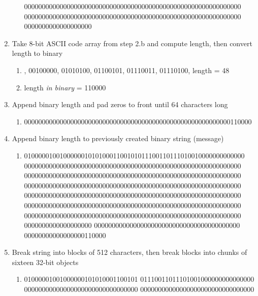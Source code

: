 \documentclass[12pt]{extarticle}
\begin{document}
\begin{enumerate}
\begin{enumerate}
        0000000000000000000000000000000000000000000000000000000000000\\
        0000000000000000000000000000000000000000000000000000000000000\\
        0000000000000000000
    \end{enumerate}
  \item Take 8-bit ASCII code array from step 2.b and compute length, then convert length to binary
     \begin{enumerate}
        \item {}, 00100000, 01010100, 01100101, 01110011, 01110100\rbrack , length = 48
        \item length {\slshape{in binary}} = 110000
    \end{enumerate}
  \item Append binary length and pad zeros to front until 64 characters long
    \begin{enumerate}
        \item 0000000000000000000000000000000000000000000000000000000000110000
    \end{enumerate}
  \item Append binary length to previously created binary string (message)
     \begin{enumerate}
        \item 01000001001000000101010001100101011100110111010010000000000000\\
        0000000000000000000000000000000000000000000000000000000000000\\
        0000000000000000000000000000000000000000000000000000000000000\\
        0000000000000000000000000000000000000000000000000000000000000\\
        0000000000000000000000000000000000000000000000000000000000000\\
        0000000000000000000000000000000000000000000000000000000000000\\
        0000000000000000000000000000000000000000000000000000000000000\\
        0000000000000000000 00000000000000000000000000000000000000000\\
        00000000000000000110000
    \end{enumerate}
  \item Break string into blocks of 512 characters, then break blocks into chunks of sixteen 32-bit objects
      \begin{enumerate}
        \item   01000001001000000101010001100101 01110011011101001000000000000000\\ 00000000000000000000000000000000 00000000000000000000000000000000\\

\end{enumerate}
\end{enumerate}
\end{document}
